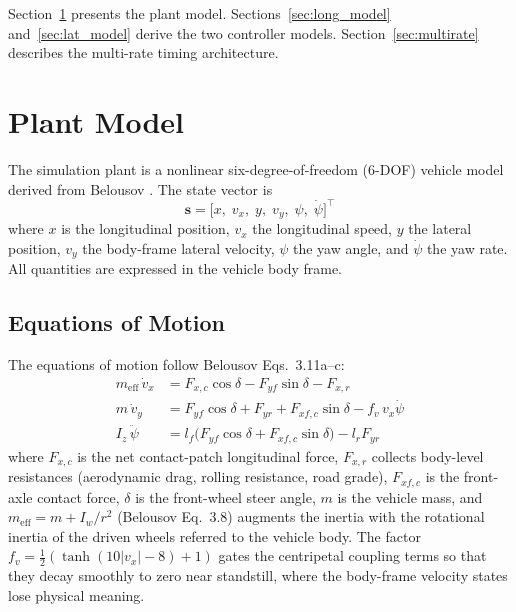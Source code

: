 \documentclass[12pt,a4paper,oneside]{report}
\begin{document}
Section~\ref{sec:plant} presents the plant model. Sections~\ref{sec:long_model}
and~\ref{sec:lat_model} derive the two controller models. Section~\ref{sec:multirate}
describes the multi-rate timing architecture.

\section{Plant Model}
\label{sec:plant}

The simulation plant is a nonlinear six-degree-of-freedom (6-DOF) vehicle model
derived from Belousov \cite{belousovDevelopmentVehicleSimulation}. The state vector
is
\begin{equation}
\mathbf{s} = \bigl[x,\; v_x,\; y,\; v_y,\; \psi,\; \dot\psi\bigr]^\top
\label{eq:plant_state}
\end{equation}
where $x$ is the longitudinal position, $v_x$ the longitudinal speed, $y$ the
lateral position, $v_y$ the body-frame lateral velocity, $\psi$ the yaw angle, and
$\dot\psi$ the yaw rate. All quantities are expressed in the vehicle body frame.

\subsection{Equations of Motion}

The equations of motion follow Belousov Eqs.~3.11a--c:
\begin{align}
m_{\text{eff}}\,\dot v_x &= F_{x,c}\cos\delta - F_{yf}\sin\delta - F_{x,r}
\label{eq:plant_long} \\
m\,\dot v_y              &= F_{yf}\cos\delta + F_{yr} + F_{xf,c}\sin\delta
                            - f_v\,v_x\dot\psi
\label{eq:plant_lat} \\
I_z\,\ddot\psi           &= l_f\bigl(F_{yf}\cos\delta + F_{xf,c}\sin\delta\bigr)
                            - l_r F_{yr}
\label{eq:plant_yaw}
\end{align}
where $F_{x,c}$ is the net contact-patch longitudinal force, $F_{x,r}$ collects
body-level resistances (aerodynamic drag, rolling resistance, road grade), $F_{xf,c}$
is the front-axle contact force, $\delta$ is the front-wheel steer angle, $m$ is the
vehicle mass, and $m_{\text{eff}} = m + I_w/r^2$ (Belousov Eq.~3.8) augments the
inertia with the rotational inertia of the driven wheels referred to the vehicle body.
The factor $f_v = \tfrac{1}{2}(\tanh(10|v_x|-8)+1)$ gates the centripetal coupling
terms so that they decay smoothly to zero near standstill, where the body-frame
velocity states lose physical meaning.
\end{document}
